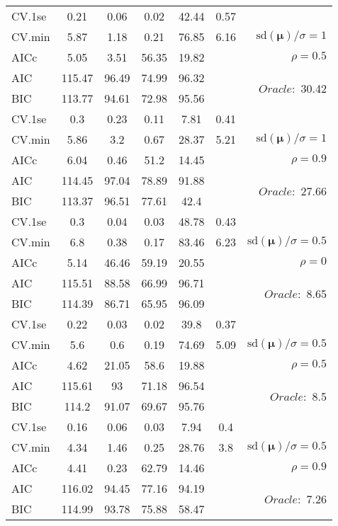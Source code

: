 \begin{table}
\begin{center}
\begin{tabular}{l*{5}{c}|r}
 \hline 
CV.1se & 0.21 & 0.06 & 0.02 & 42.44 & 0.57 & \\
CV.min & 5.87 & 1.18 & 0.21 & 76.85 & 6.16 &  $\mathrm{sd}(\mathbf{\mu})/\sigma=1$ \\
AICc & 5.05 & 3.51 & 56.35 & 19.82 & & $\rho=0.5$ \\
AIC & 115.47 & 96.49 & 74.99 & 96.32 & &  \multirow{2}{*}{$Oracle: $ 30.42} \\
BIC & 113.77 & 94.61 & 72.98 & 95.56 & &  \\
 \hline 
CV.1se & 0.3 & 0.23 & 0.11 & 7.81 & 0.41 & \\
CV.min & 5.86 & 3.2 & 0.67 & 28.37 & 5.21 &  $\mathrm{sd}(\mathbf{\mu})/\sigma=1$ \\
AICc & 6.04 & 0.46 & 51.2 & 14.45 & & $\rho=0.9$ \\
AIC & 114.45 & 97.04 & 78.89 & 91.88 & &  \multirow{2}{*}{$Oracle: $ 27.66} \\
BIC & 113.37 & 96.51 & 77.61 & 42.4 & &  \\
 \hline 
CV.1se & 0.3 & 0.04 & 0.03 & 48.78 & 0.43 & \\
CV.min & 6.8 & 0.38 & 0.17 & 83.46 & 6.23 &  $\mathrm{sd}(\mathbf{\mu})/\sigma=0.5$ \\
AICc & 5.14 & 46.46 & 59.19 & 20.55 & & $\rho=0$ \\
AIC & 115.51 & 88.58 & 66.99 & 96.71 & &  \multirow{2}{*}{$Oracle: $ 8.65} \\
BIC & 114.39 & 86.71 & 65.95 & 96.09 & &  \\
 \hline 
CV.1se & 0.22 & 0.03 & 0.02 & 39.8 & 0.37 & \\
CV.min & 5.6 & 0.6 & 0.19 & 74.69 & 5.09 &  $\mathrm{sd}(\mathbf{\mu})/\sigma=0.5$ \\
AICc & 4.62 & 21.05 & 58.6 & 19.88 & & $\rho=0.5$ \\
AIC & 115.61 & 93 & 71.18 & 96.54 & &  \multirow{2}{*}{$Oracle: $ 8.5} \\
BIC & 114.2 & 91.07 & 69.67 & 95.76 & &  \\
 \hline 
CV.1se & 0.16 & 0.06 & 0.03 & 7.94 & 0.4 & \\
CV.min & 4.34 & 1.46 & 0.25 & 28.76 & 3.8 &  $\mathrm{sd}(\mathbf{\mu})/\sigma=0.5$ \\
AICc & 4.41 & 0.23 & 62.79 & 14.46 & & $\rho=0.9$ \\
AIC & 116.02 & 94.45 & 77.16 & 94.19 & &  \multirow{2}{*}{$Oracle: $ 7.26} \\
BIC & 114.99 & 93.78 & 75.88 & 58.47 & &  \\
 \hline 
\end{tabular}
\end{center}
\vspace{-1cm}
\end{table}




